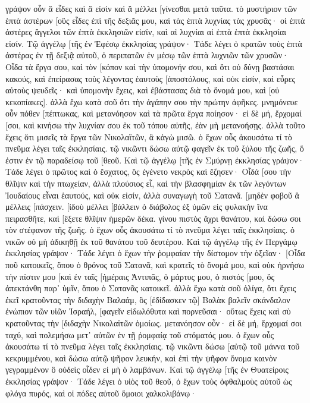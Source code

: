 γράψον οὖν ἃ εἶδες καὶ ἃ εἰσὶν καὶ ἃ μέλλει [γίνεσθαι μετὰ ταῦτα. 
τὸ μυστήριον τῶν ἑπτὰ ἀστέρων [οὓς εἶδες ἐπὶ τῆς δεξιᾶς μου, καὶ τὰς ἑπτὰ λυχνίας τὰς χρυσᾶς· οἱ ἑπτὰ ἀστέρες ἄγγελοι τῶν ἑπτὰ ἐκκλησιῶν εἰσίν, καὶ αἱ λυχνίαι αἱ ἑπτὰ ἑπτὰ ἐκκλησίαι εἰσίν. 
Τῷ ἀγγέλῳ [τῆς ἐν Ἐφέσῳ ἐκκλησίας γράψον· Τάδε λέγει ὁ κρατῶν τοὺς ἑπτὰ ἀστέρας ἐν τῇ δεξιᾷ αὐτοῦ, ὁ περιπατῶν ἐν μέσῳ τῶν ἑπτὰ λυχνιῶν τῶν χρυσῶν· 
Οἶδα τὰ ἔργα σου, καὶ τὸν [κόπον καὶ τὴν ὑπομονήν σου, καὶ ὅτι οὐ δύνῃ βαστάσαι κακούς, καὶ ἐπείρασας τοὺς λέγοντας ἑαυτοὺς [ἀποστόλους, καὶ οὐκ εἰσίν, καὶ εὗρες αὐτοὺς ψευδεῖς· 
καὶ ὑπομονὴν ἔχεις, καὶ ἐβάστασας διὰ τὸ ὄνομά μου, καὶ [οὐ κεκοπίακες]. 
ἀλλὰ ἔχω κατὰ σοῦ ὅτι τὴν ἀγάπην σου τὴν πρώτην ἀφῆκες. 
μνημόνευε οὖν πόθεν [πέπτωκας, καὶ μετανόησον καὶ τὰ πρῶτα ἔργα ποίησον· εἰ δὲ μή, ἔρχομαί [σοι, καὶ κινήσω τὴν λυχνίαν σου ἐκ τοῦ τόπου αὐτῆς, ἐὰν μὴ μετανοήσῃς. 
ἀλλὰ τοῦτο ἔχεις ὅτι μισεῖς τὰ ἔργα τῶν Νικολαϊτῶν, ἃ κἀγὼ μισῶ. 
ὁ ἔχων οὖς ἀκουσάτω τί τὸ πνεῦμα λέγει ταῖς ἐκκλησίαις. τῷ νικῶντι δώσω αὐτῷ φαγεῖν ἐκ τοῦ ξύλου τῆς ζωῆς, ὅ ἐστιν ἐν τῷ παραδείσῳ τοῦ [θεοῦ. 
Καὶ τῷ ἀγγέλῳ [τῆς ἐν Σμύρνῃ ἐκκλησίας γράψον· Τάδε λέγει ὁ πρῶτος καὶ ὁ ἔσχατος, ὃς ἐγένετο νεκρὸς καὶ ἔζησεν· 
Οἶδά [σου τὴν θλῖψιν καὶ τὴν πτωχείαν, ἀλλὰ πλούσιος εἶ, καὶ τὴν βλασφημίαν ἐκ τῶν λεγόντων Ἰουδαίους εἶναι ἑαυτούς, καὶ οὐκ εἰσίν, ἀλλὰ συναγωγὴ τοῦ Σατανᾶ. 
[μηδὲν φοβοῦ ἃ μέλλεις [πάσχειν. [ἰδοὺ μέλλει [βάλλειν ὁ διάβολος ἐξ ὑμῶν εἰς φυλακὴν ἵνα πειρασθῆτε, καὶ [ἕξετε θλῖψιν ἡμερῶν δέκα. γίνου πιστὸς ἄχρι θανάτου, καὶ δώσω σοι τὸν στέφανον τῆς ζωῆς. 
ὁ ἔχων οὖς ἀκουσάτω τί τὸ πνεῦμα λέγει ταῖς ἐκκλησίαις. ὁ νικῶν οὐ μὴ ἀδικηθῇ ἐκ τοῦ θανάτου τοῦ δευτέρου. 
Καὶ τῷ ἀγγέλῳ τῆς ἐν Περγάμῳ ἐκκλησίας γράψον· Τάδε λέγει ὁ ἔχων τὴν ῥομφαίαν τὴν δίστομον τὴν ὀξεῖαν· 
[Οἶδα ποῦ κατοικεῖς, ὅπου ὁ θρόνος τοῦ Σατανᾶ, καὶ κρατεῖς τὸ ὄνομά μου, καὶ οὐκ ἠρνήσω τὴν πίστιν μου [καὶ ἐν ταῖς [ἡμέραις Ἀντιπᾶς, ὁ μάρτυς μου, ὁ πιστός [μου, ὃς ἀπεκτάνθη παρ᾽ ὑμῖν, ὅπου ὁ Σατανᾶς κατοικεῖ. 
ἀλλὰ ἔχω κατὰ σοῦ ὀλίγα, ὅτι ἔχεις ἐκεῖ κρατοῦντας τὴν διδαχὴν Βαλαάμ, ὃς [ἐδίδασκεν τῷ] Βαλὰκ βαλεῖν σκάνδαλον ἐνώπιον τῶν υἱῶν Ἰσραήλ, [φαγεῖν εἰδωλόθυτα καὶ πορνεῦσαι· 
οὕτως ἔχεις καὶ σὺ κρατοῦντας τὴν [διδαχὴν Νικολαϊτῶν ὁμοίως. 
μετανόησον οὖν· εἰ δὲ μή, ἔρχομαί σοι ταχύ, καὶ πολεμήσω μετ᾽ αὐτῶν ἐν τῇ ῥομφαίᾳ τοῦ στόματός μου. 
ὁ ἔχων οὖς ἀκουσάτω τί τὸ πνεῦμα λέγει ταῖς ἐκκλησίαις. τῷ νικῶντι δώσω [αὐτῷ τοῦ μάννα τοῦ κεκρυμμένου, καὶ δώσω αὐτῷ ψῆφον λευκήν, καὶ ἐπὶ τὴν ψῆφον ὄνομα καινὸν γεγραμμένον ὃ οὐδεὶς οἶδεν εἰ μὴ ὁ λαμβάνων. 
Καὶ τῷ ἀγγέλῳ [τῆς ἐν Θυατείροις ἐκκλησίας γράψον· Τάδε λέγει ὁ υἱὸς τοῦ θεοῦ, ὁ ἔχων τοὺς ὀφθαλμοὺς αὐτοῦ ὡς φλόγα πυρός, καὶ οἱ πόδες αὐτοῦ ὅμοιοι χαλκολιβάνῳ· 
